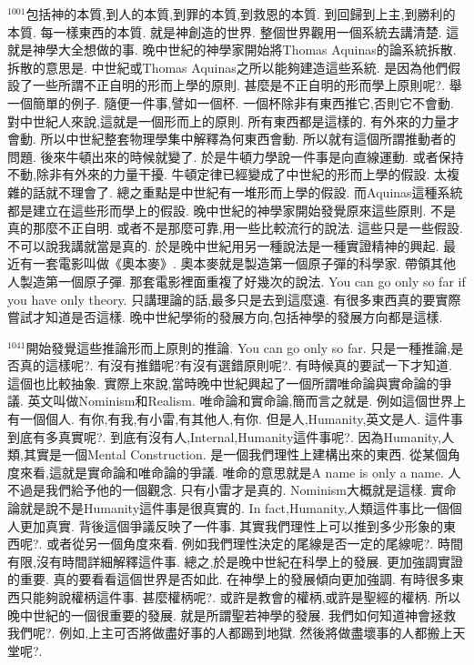 \documentclass{book}
\begin{document}
$^{1001}$包括神的本質,到人的本質,到罪的本質,到救恩的本質.
到回歸到上主,到勝利的本質.
每一樣東西的本質.
就是神創造的世界.
整個世界觀用一個系統去講清楚.
這就是神學大全想做的事.
晚中世紀的神學家開始將Thomas Aquinas的論系統拆散.
拆散的意思是.
中世紀或Thomas Aquinas之所以能夠建造這些系統.
是因為他們假設了一些所謂不正自明的形而上學的原則.
甚麼是不正自明的形而學上原則呢?.
舉一個簡單的例子.
隨便一件事,譬如一個杯.
一個杯除非有東西推它,否則它不會動.
對中世紀人來說,這就是一個形而上的原則.
所有東西都是這樣的.
有外來的力量才會動.
所以中世紀整套物理學集中解釋為何東西會動.
所以就有這個所謂推動者的問題.
後來牛頓出來的時候就變了.
於是牛頓力學說一件事是向直線運動.
或者保持不動,除非有外來的力量干擾.
牛頓定律已經變成了中世紀的形而上學的假設.
太複雜的話就不理會了.
總之重點是中世紀有一堆形而上學的假設.
而Aquinas這種系統都是建立在這些形而學上的假設.
晚中世紀的神學家開始發覺原來這些原則.
不是真的那麼不正自明.
或者不是那麼可靠,用一些比較流行的說法.
這些只是一些假設.
不可以說我講就當是真的.
於是晚中世紀用另一種說法是一種實證精神的興起.
最近有一套電影叫做《奧本麥》.
奧本麥就是製造第一個原子彈的科學家.
帶領其他人製造第一個原子彈.
那套電影裡面重複了好幾次的說法.
You can go only so far if you have only theory.
只講理論的話,最多只是去到這麼遠.
有很多東西真的要實際嘗試才知道是否這樣.
晚中世紀學術的發展方向,包括神學的發展方向都是這樣.

$^{1041}$開始發覺這些推論形而上原則的推論.
You can go only so far.
只是一種推論,是否真的這樣呢?.
有沒有推錯呢?有沒有選錯原則呢?.
有時候真的要試一下才知道.
這個也比較抽象.
實際上來說,當時晚中世紀興起了一個所謂唯命論與實命論的爭議.
英文叫做Nominism和Realism.
唯命論和實命論,簡而言之就是.
例如這個世界上有一個個人.
有你,有我,有小雷,有其他人,有你.
但是人,Humanity,英文是人.
這件事到底有多真實呢?.
到底有沒有人,Internal,Humanity這件事呢?.
因為Humanity,人類,其實是一個Mental Construction.
是一個我們理性上建構出來的東西.
從某個角度來看,這就是實命論和唯命論的爭議.
唯命的意思就是A name is only a name.
人不過是我們給予他的一個觀念.
只有小雷才是真的.
Nominism大概就是這樣.
實命論就是說不是Humanity這件事是很真實的.
In fact,Humanity,人類這件事比一個個人更加真實.
背後這個爭議反映了一件事.
其實我們理性上可以推到多少形象的東西呢?.
或者從另一個角度來看.
例如我們理性決定的尾線是否一定的尾線呢?.
時間有限,沒有時間詳細解釋這件事.
總之,於是晚中世紀在科學上的發展.
更加強調實證的重要.
真的要看看這個世界是否如此.
在神學上的發展傾向更加強調.
有時很多東西只能夠說權柄這件事.
甚麼權柄呢?.
或許是教會的權柄,或許是聖經的權柄.
所以晚中世紀的一個很重要的發展.
就是所謂聖若神學的發展.
我們如何知道神會拯救我們呢?.
例如,上主可否將做盡好事的人都踢到地獄.
然後將做盡壞事的人都搬上天堂呢?.
\end{document}
